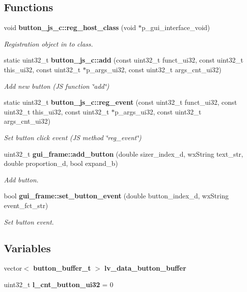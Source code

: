 \subsection*{Functions}
\begin{DoxyCompactItemize}
\item 
void \textbf{ button\+\_\+js\+\_\+c\+::reg\+\_\+host\+\_\+class} (void $\ast$p\+\_\+gui\+\_\+interface\+\_\+void)
\begin{DoxyCompactList}\small\item\em Registration object in to class. \end{DoxyCompactList}\item 
static uint32\+\_\+t \textbf{ button\+\_\+js\+\_\+c\+::add} (const uint32\+\_\+t funct\+\_\+ui32, const uint32\+\_\+t this\+\_\+ui32, const uint32\+\_\+t $\ast$p\+\_\+args\+\_\+ui32, const uint32\+\_\+t args\+\_\+cnt\+\_\+ui32)
\begin{DoxyCompactList}\small\item\em Add new button (JS function \char`\"{}add\char`\"{}) \end{DoxyCompactList}\item 
static uint32\+\_\+t \textbf{ button\+\_\+js\+\_\+c\+::reg\+\_\+event} (const uint32\+\_\+t funct\+\_\+ui32, const uint32\+\_\+t this\+\_\+ui32, const uint32\+\_\+t $\ast$p\+\_\+args\+\_\+ui32, const uint32\+\_\+t args\+\_\+cnt\+\_\+ui32)
\begin{DoxyCompactList}\small\item\em Set button click event (JS method \char`\"{}reg\+\_\+event\char`\"{}) \end{DoxyCompactList}\item 
uint32\+\_\+t \textbf{ gui\+\_\+frame\+::add\+\_\+button} (double sizer\+\_\+index\+\_\+d, wx\+String text\+\_\+str, double proportion\+\_\+d, bool expand\+\_\+b)
\begin{DoxyCompactList}\small\item\em Add button. \end{DoxyCompactList}\item 
bool \textbf{ gui\+\_\+frame\+::set\+\_\+button\+\_\+event} (double button\+\_\+index\+\_\+d, wx\+String event\+\_\+fct\+\_\+str)
\begin{DoxyCompactList}\small\item\em Set button event. \end{DoxyCompactList}\end{DoxyCompactItemize}
\subsection*{Variables}
\begin{DoxyCompactItemize}
\item 
vector$<$ \textbf{ button\+\_\+buffer\+\_\+t} $>$ \textbf{ lv\+\_\+data\+\_\+button\+\_\+buffer}
\item 
\mbox{\label{group___button_ga43a3c4dd74be17115ca7f07710241238}} 
uint32\+\_\+t {\bfseries l\+\_\+cnt\+\_\+button\+\_\+ui32} = 0
\end{DoxyCompactItemize}


